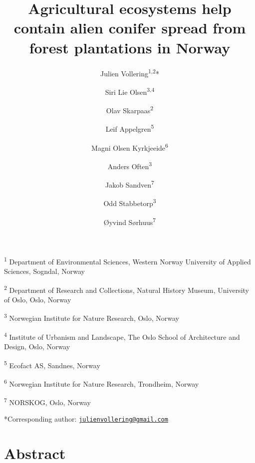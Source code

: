 \documentclass[
]{article}
\title{Agricultural ecosystems help contain alien conifer spread from forest plantations in Norway}
\author{Julien Vollering\textsuperscript{1,2}* \and Siri Lie Olsen\textsuperscript{3,4} \and Olav Skarpaas\textsuperscript{2} \and Leif Appelgren\textsuperscript{5} \and Magni Olsen Kyrkjeeide\textsuperscript{6} \and Anders Often\textsuperscript{3} \and Jakob Sandven\textsuperscript{7} \and Odd Stabbetorp\textsuperscript{3} \and Øyvind Sørhuus\textsuperscript{7}}
\date{}
\begin{document}
\maketitle

\textsuperscript{1} Department of Environmental Sciences, Western Norway University of Applied
Sciences, Sogndal, Norway

\textsuperscript{2} Department of Research and Collections, Natural History Museum, University
of Oslo, Oslo, Norway

\textsuperscript{3} Norwegian Institute for Nature Research, Oslo, Norway

\textsuperscript{4} Institute of Urbanism and Landscape, The Oslo School of Architecture and
Design, Oslo, Norway

\textsuperscript{5} Ecofact AS, Sandnes, Norway

\textsuperscript{6} Norwegian Institute for Nature Research, Trondheim, Norway

\textsuperscript{7} NORSKOG, Oslo, Norway

*Corresponding author:
\href{mailto:julienvollering@gmail.com}{\nolinkurl{julienvollering@gmail.com}}

\section{Abstract}\label{abstract}
\end{document}
